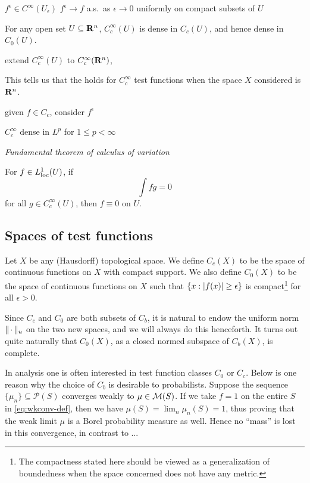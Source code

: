 $f^\epsilon \in C^\infty(U_\epsilon)$
$f^\epsilon \to f$ a.s.\ as $\epsilon \to 0$
uniformly on compact subsets of $U$

For any open set $U \subseteq \mathbf{R}^n$, $C_c^\infty(U)$ is dense in $C_c(U)$, and hence dense in $C_0(U)$.

extend $C_c^\infty(U)$ to $C_c^\infty(\mathbf{R}^n)$,



This tells us that the  holds for $C_c^\infty$ test functions when the space $X$ considered is $\mathbf{R}^n$.

given $f \in C_c$, consider $f^\epsilon$

$C_c^\infty$ dense in $L^p$ for $1  \leq p < \infty$


\emph{Fundamental theorem of calculus of variation}

\begin{thm}
    For $f \in L^1_\mathrm{loc}(U)$, if \[\int f g = 0\] for all $g \in C_c^\infty(U)$, then $f \equiv 0$ on $U$.
\end{thm}

\begin{defn}
    
\end{defn}


\subsection{Spaces of test functions}

Let $X$ be any (Hausdorff) topological space. We define $C_c(X)$ to be the space of continuous functions on $X$ with compact support. We also define $C_0(X)$ to be the space of continuous functions on $X$ such that $\{x:\lvert f(x) \rvert \geq \epsilon\}$ is compact\footnote{The compactness stated here should be viewed as a generalization of boundedness when the space concerned does not have any metric.} for all $\epsilon > 0$.

Since $C_c$ and $C_0$ are both subsets of $C_b$, it is natural to endow the uniform norm $\lVert \,\cdot\, \rVert_u$ on the two new spaces, and we will always do this henceforth. It turns out quite naturally that $C_0(X)$, as a closed normed subspace of $C_b(X)$, is complete.

In analysis one is often interested in test function classes $C_0$ or $C_c$. Below is one reason why the choice of $C_b$ is desirable to probabilists. Suppose the sequence $\{\mu_n\} \subseteq \mathcal{P}(S)$ converges weakly to $\mu\in \mathcal{M}(S)$. If we take $f = 1$ on the entire $S$ in \eqref{eq:wkconv-def}, then we have $\mu(S) = \lim_n \mu_n(S) = 1$, thus proving that the weak limit $\mu$ is a Borel probability measure as well. Hence no ``mass'' is lost in this convergence, in contrast to ...

